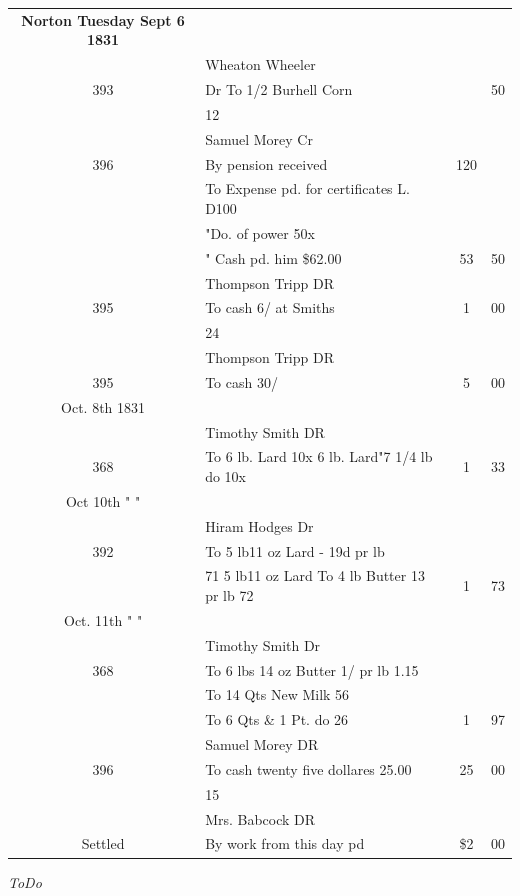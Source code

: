 \documentclass[12pt,a4paper]{article}
\begin{document}
\begin{tabular}{clcc}
 \textbf{Norton Tuesday Sept 6 1831}\\
    & Wheaton Wheeler & &\\
393 & Dr To 1/2 Burhell Corn & & 50 \\
    & 12 & &\\
    & Samuel Morey  Cr  & &\\
396 & By pension received & 120 & \\
    & To Expense pd. for certificates L. D100 & &\\
    & "Do. of power 50x & &\\
    & " Cash pd. him \$62.00 & 53 & 50\\
    & Thompson Tripp  DR  & &\\
395 & To cash 6/ at Smiths & 1 & 00\\	
    & 24 & &\\
    & Thompson Tripp  DR & &\\	
395 & To cash 30/ & 5  & 00\\		
Oct. 8th 1831\\
    & Timothy Smith DR & &\\
368 & To 6 lb. Lard 10x 6 lb. Lard"7 1/4 lb do 10x & 1 & 33 \\
Oct 10th " "\\
    & Hiram Hodges Dr & &\\
392 & To 5 lb11 oz Lard - 19d pr lb\\
    & 71 5 lb11 oz Lard To 4 lb Butter 13 pr lb 72 & 1 & 73\\
Oct. 11th " "\\
    & Timothy Smith  Dr& &\\
368 & To 6 lbs 14 oz Butter 1/ pr lb 1.15 & & \\ & To 14 Qts New Milk 56 & &\\
& To 6 Qts \& 1 Pt. do 26 & 1 & 97 	\\	
    & Samuel Morey DR & &\\
396 & To cash twenty five dollares 25.00 & 25 & 00\\
    & 15 & & \\	
    & Mrs. Babcock DR  & & \\		
Settled & By work from this day pd & \$2 & 00
\end{tabular}
\medskip
\begin{center}
\textit{ToDo}
\end{center}
\end{document}
